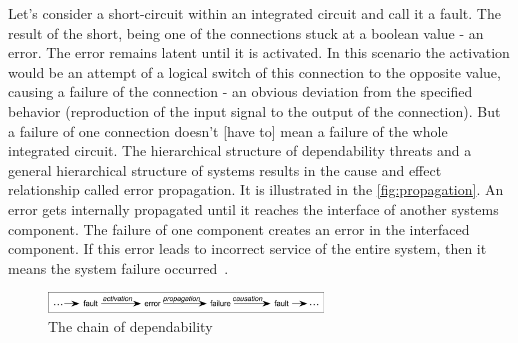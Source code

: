 Let's consider a short-circuit within an integrated circuit and call it a fault. The result of the short, being one of the connections stuck at a boolean value - an error. The error remains latent until it is activated. In this scenario the activation would be an attempt of a logical switch of this connection to the opposite value, causing a failure of the connection - an obvious deviation from the specified behavior (reproduction of the input signal to the output of the connection). But a failure of one connection doesn't [have to] mean a failure of the whole integrated circuit. The hierarchical structure of dependability threats and a general hierarchical structure of systems results in the cause and effect relationship called error propagation. It is illustrated in the \autoref{fig:propagation}. An error gets internally propagated until it reaches the interface of another systems component. The failure of one component creates an error in the interfaced component. If this error leads to incorrect service of the entire system, then it means the system failure occurred~\cite{art:Avizienis, art:Avizienis2}. \\

\begin{figure}[H]
\centering
\includegraphics[width=0.65\textwidth]{figures/propagation.png}
\caption{The chain of dependability~\cite{art:Avizienis}}
\label{fig:propagation}
\end{figure}

